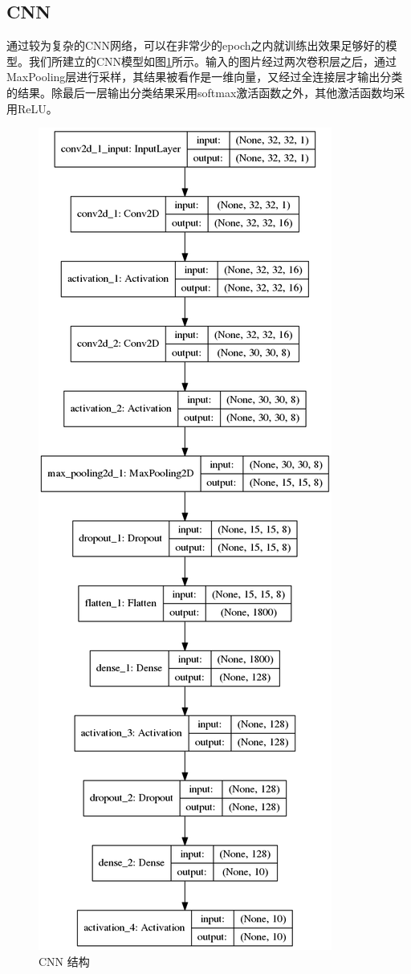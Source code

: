 \documentclass[UTF8]{ctexart}
\begin{document}
\subsection{CNN}

通过较为复杂的CNN网络，可以在非常少的epoch之内就训练出效果足够好的模型。我们所建立的CNN模型如图\ref{cnn_model}所示。输入的图片经过两次卷积层之后，通过MaxPooling层进行采样，其结果被看作是一维向量，又经过全连接层才输出分类的结果。除最后一层输出分类结果采用softmax激活函数之外，其他激活函数均采用ReLU。

\begin{figure}
	\centering
	\includegraphics[scale=0.4]{model}
	\caption{CNN 结构}
	\label{cnn_model}
\end{figure}
\end{document}
